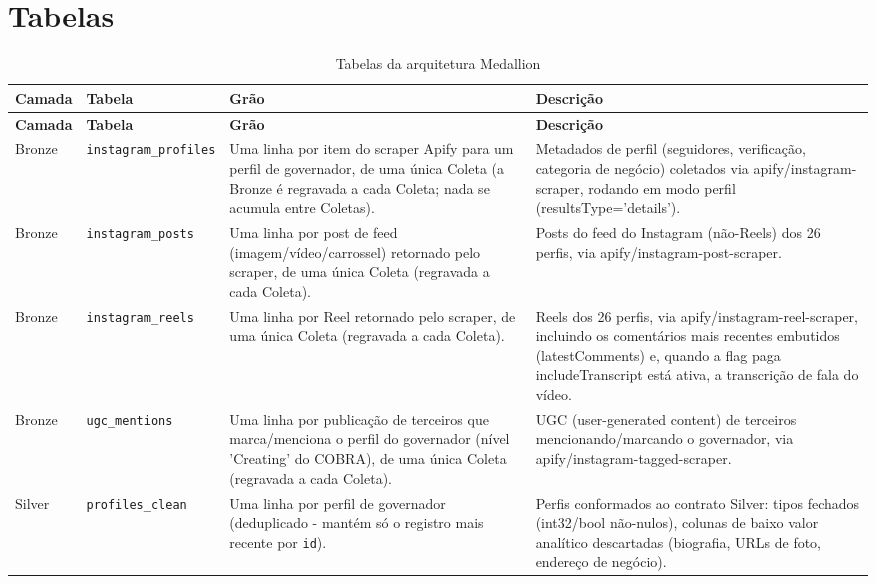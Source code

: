 \section*{Tabelas}
\begin{footnotesize}
\begin{longtable}{p{1.2cm}p{3.4cm}p{3.6cm}p{6.0cm}}
\caption{Tabelas da arquitetura Medallion}\label{tab:dic_tabelas}\\
\toprule \textbf{Camada} & \textbf{Tabela} & \textbf{Grão} & \textbf{Descrição} \\ \midrule \endfirsthead
\toprule \textbf{Camada} & \textbf{Tabela} & \textbf{Grão} & \textbf{Descrição} \\ \midrule \endhead
\bottomrule \endfoot
Bronze & \texttt{instagram\_\allowbreak{}profiles} & Uma linha por item do scraper Apify para um perfil de governador, de uma única Coleta (a Bronze é regravada a cada Coleta; nada se acumula entre Coletas). & Metadados de perfil (seguidores, verificação, categoria de negócio) coletados via apify/\allowbreak{}instagram-scraper, rodando em modo perfil (resultsType='details'). \\
Bronze & \texttt{instagram\_\allowbreak{}posts} & Uma linha por post de feed (imagem/\allowbreak{}vídeo/\allowbreak{}carrossel) retornado pelo scraper, de uma única Coleta (regravada a cada Coleta). & Posts do feed do Instagram (não-Reels) dos 26 perfis, via apify/\allowbreak{}instagram-post-scraper. \\
Bronze & \texttt{instagram\_\allowbreak{}reels} & Uma linha por Reel retornado pelo scraper, de uma única Coleta (regravada a cada Coleta). & Reels dos 26 perfis, via apify/\allowbreak{}instagram-reel-scraper, incluindo os comentários mais recentes embutidos (latestComments) e, quando a flag paga includeTranscript está ativa, a transcrição de fala do vídeo. \\
Bronze & \texttt{ugc\_\allowbreak{}mentions} & Uma linha por publicação de terceiros que marca/\allowbreak{}menciona o perfil do governador (nível 'Creating' do COBRA), de uma única Coleta (regravada a cada Coleta). & UGC (user-generated content) de terceiros mencionando/\allowbreak{}marcando o governador, via apify/\allowbreak{}instagram-tagged-scraper. \\
Silver & \texttt{profiles\_\allowbreak{}clean} & Uma linha por perfil de governador (deduplicado - mantém só o registro mais recente por \texttt{id}). & Perfis conformados ao contrato Silver: tipos fechados (int32/\allowbreak{}bool não-nulos), colunas de baixo valor analítico descartadas (biografia, URLs de foto, endereço de negócio). \\

\end{longtable}
\end{footnotesize}
